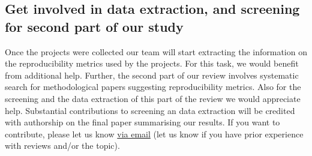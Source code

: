 \documentclass[a4paper,11pt]{report}
\begin{document}
\subsection*{Get involved in data extraction, and screening for second part of our study}
Once the projects were collected our team will start extracting the information on the reproducibility metrics used by the projects. For this task, we would benefit from additional help. Further, the second part of our review involves systematic search for methodological papers suggesting reproducibility metrics. Also for the screening and the data extraction of this part of the review we would appreciate help. Substantial contributions to screening an data extraction will be credited with authorship on the final paper summarising our results. If you want to contribute, please let us know \href{mailto:rachel.heyard@uzh.ch}{via email} (let us know if you have prior experience with reviews and/or the topic).
\end{document}
